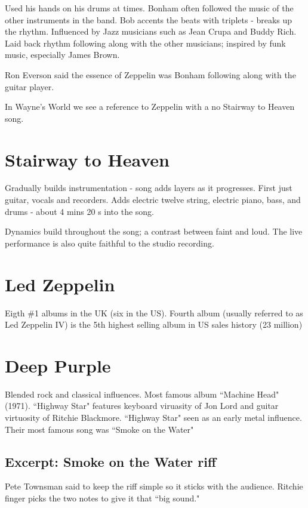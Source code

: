 \documentclass[12pt, a4paper, twoside, openright, titlepage]{book}
\begin{document}
Used his hands on his drums at times. Bonham often followed the music of the other instruments in the band. Bob accents the beats with triplets - breaks up the rhythm. Influenced by Jazz musicians such as Jean Crupa and Buddy Rich. Laid back rhythm following along with the other musicians; inspired by funk music, especially James Brown.


Ron Everson said the essence of Zeppelin was Bonham following along with the guitar player. 


In Wayne's World we see a reference to Zeppelin with a no Stairway to Heaven song. 


\section{Stairway to Heaven}

Gradually builds instrumentation - song adds layers as it progresses. First just guitar, vocals and recorders. Adds electric twelve string, electric piano, bass, and drums - about 4 mins 20 s into the song.

Dynamics build throughout the song; a contrast between faint and loud. The live performance is also quite faithful to the studio recording.


\section{Led Zeppelin}

Eigth \#1 albums in the UK (six in the US). Fourth album (usually referred to as Led Zeppelin IV) is the 5th highest selling album in US sales history (23 million)


\section{Deep Purple}

Blended rock and classical influences. Most famous album ``Machine Head" (1971). ``Highway Star" features keyboard viruasity of Jon Lord and guitar virtuosity of Ritchie Blackmore. ``Highway Star" seen as an early metal influence. Their most famous song was ``Smoke on the Water"

\subsection{Excerpt: Smoke on the Water riff}

Pete Townsman said to keep the riff simple so it sticks with the audience. Ritchie finger picks the two notes to give it that ``big sound."
\end{document}

